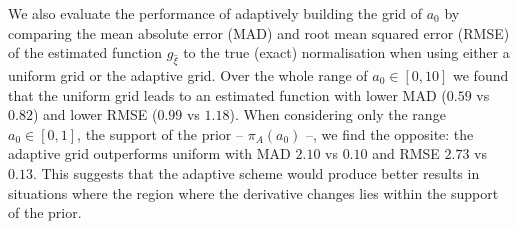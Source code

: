\documentclass[a4paper, notitlepage, 11pt]{article}
\begin{document}
We also evaluate the performance of adaptively building the grid of $a_0$ by comparing the mean absolute error (MAD) and root mean squared error (RMSE) of the estimated function $g_{\hat{\xi}}$ to the true (exact) normalisation when using either a uniform grid or the adaptive grid.
Over the whole range of $a_0 \in [0, 10]$ we found that the uniform grid leads to an estimated function with lower MAD ($0.59$ vs $0.82$) and lower RMSE ($0.99$ vs $1.18$). 
When considering only the range $a_0 \in [0, 1]$, the support of the prior -- $\pi_A(a_0)$ --,  we find the opposite: the adaptive grid outperforms uniform with MAD $2.10$ vs $0.10$ and RMSE $2.73$ vs $0.13$.
This suggests that the adaptive scheme would produce better results in situations where the region where the derivative changes lies within the support of the prior.
\end{document}
